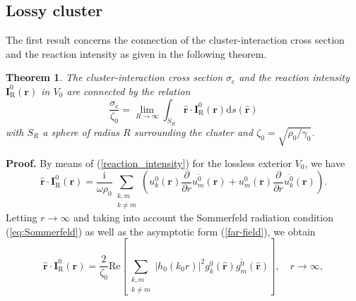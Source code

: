 \documentclass{article}
\newtheorem{theorem}{Theorem}
\begin{document}
\subsection{Lossy cluster}
%
The first result concerns the connection of the cluster-interaction cross section and the reaction intensity as given in the following theorem.
%
\begin{theorem}
    \label{Theorem0}
    The cluster-interaction cross section $\sigma_\mathrm{c}$ and the reaction intensity $\mathbf{I}_{\mathrm{R}}^0(\mathbf{r})$ in $V_0$ are connected by the relation
%
\begin{equation}
\label{Theorem1_0}
\frac{\sigma_\mathrm{c}}{\zeta_0}=\lim_{R\rightarrow\infty}\int_{S_R}\hat{\mathbf{r}}\cdot\mathbf{I}_{\mathrm{R}}^0(\mathbf{r})\mathrm{d}s(\hat{\mathbf{r}})
\end{equation}
%
with $S_R$ a sphere of radius $R$ surrounding the cluster and $\zeta_0=\sqrt{\rho_0/\gamma_0}$.
\end{theorem}
%
\textbf{Proof.}
By means of (\ref{reaction_intensity}) for the lossless exterior $V_0$, we have
%
\begin{equation}
\label{Theorem1_1}
        \hat{\mathbf{r}}\cdot\mathbf{I}_{\mathrm{R}}^0(\mathbf{r})=\frac{\mathrm{i}}{\omega\rho_0}\sum_{\substack{k,m\\k\ne m}}\left(u_k^{0}(\mathbf{r})\frac{\partial}{\partial r}\overline{u_m^{0}}(\mathbf{r})+u_m^{0}(\mathbf{r})\frac{\partial}{\partial r}\overline{u_k^{0}}(\mathbf{r})\right).
\end{equation}
%
Letting $r\rightarrow\infty$ and taking into account the Sommerfeld radiation condition (\ref{eq:Sommerfeld}) as well as the asymptotic form (\ref{far-field}), we obtain
%
\begin{equation}
    \label{Theorem1_3}
    \hat{\mathbf{r}}\cdot\mathbf{I}_{\mathrm{R}}^0(\mathbf{r})=\frac{2}{\zeta_0}\mathrm{Re}\left[\sum_{\substack{k,m\\k\ne m}}\lvert h_0(k_0r)\rvert^2 g_k^{0}(\hat{\mathbf{r}})\overline{g_m^{0}}(\hat{\mathbf{r}})\right], \quad r\rightarrow\infty,
\end{equation}
\end{document}
